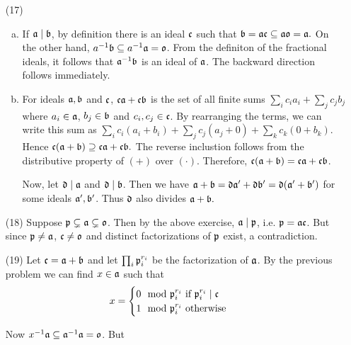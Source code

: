 \documentclass{article}
\theoremstyle{definition}
\theoremstyle{remark}
\begin{document}
\begin{enumerate}
  \item[(17)]
        \begin{enumerate}[(a)]
          \item If $\mathfrak{a} \mid \mathfrak{b}$, by definition there is an ideal $\mathfrak{c}$ such that $\mathfrak{b}  = \mathfrak{a} \mathfrak{c}  \subseteq \mathfrak{a}  \mathfrak{o} = \mathfrak{a}.$ On the other hand,  $\I \I a^{-1}\I b \subseteq a^{-1}\I a = \io$. From the definiton of the fractional ideals, it follows that $\mathfrak{a}^{-1}\mathfrak{b}$ is an ideal of $\mathfrak{a}$. The backward direction follows immediately.


          \item For  ideals $\mathfrak{a}, \mathfrak{b}$ and $\mathfrak{c}$, $\mathfrak{c}\mathfrak{a} + \mathfrak{c}\mathfrak{b}$ is the set of all finite sums $\sum_i c_ia_i + \sum_j c_jb_j$ where $a_i \in \mathfrak{a}$, $b_j \in \mathfrak{b}$ and $c_i, c_j \in \mathfrak{c}$. By rearranging the terms, we can write this sum as $\sum_i c_i(a_i + b_i)+ \sum_j c_j(a_j + 0)+ \sum_k c_k(0 + b_k)$. Hence $\mathfrak{c}(\mathfrak{a} + \mathfrak{b}) \supseteq \mathfrak{c}\mathfrak{a} + \mathfrak{c}\mathfrak{b}.$ The reverse inclustion follows from the distributive property of $(+)$ over $(\cdot)$. Therefore, $\mathfrak{c}(\mathfrak{a} + \mathfrak{b}) = \mathfrak{c}\mathfrak{a} + \mathfrak{c}\mathfrak{b}$.

                Now, let $\mathfrak{d} \mid \mathfrak{a}$ and $\mathfrak{d} \mid \mathfrak{b}$. Then we have $\mathfrak{a} + \mathfrak{b} = \mathfrak{d}\mathfrak{a}' + \mathfrak{d}\mathfrak{b}' = \mathfrak{d}(\mathfrak{a}' + \mathfrak{b}')$ for some ideals $\mathfrak{a}', \mathfrak{b}'$. Thus $\mathfrak{d}$ also divides $\mathfrak{a} + \mathfrak{b}.$
        \end{enumerate}

  \item[(18)] Suppose $\mathfrak{p} \subsetneq \mathfrak{a} \subsetneq \mathfrak{o}$. Then by the above exercise, $\mathfrak{a} \mid \mathfrak{p}$, i.e. $\mathfrak{p} = \mathfrak{a}\mathfrak{c}$. But since $\mathfrak{p} \neq \mathfrak{a}$, $\mathfrak{c} \neq \mathfrak{o}$ and distinct factorizations of $\mathfrak{p}$ exist, a contradiction.

  \item[(19)] Let $\mathfrak{c} = \mathfrak{a} + \mathfrak{b}$ and let $\prod_i\mathfrak{p}_i^{r_i}$ be the factorization of $\mathfrak{a}$. By the previous problem we can find $x \in \mathfrak{a}$ such that
        $$x =
        \begin{cases}
          0 \mod {\mathfrak{p}}_i^{r_i} \text{ if } \mathfrak{p}^{r_i}_i \mid \mathfrak{c} \\
          1 \mod {\mathfrak{p}}^{r_i}_i \text{ otherwise }
        \end{cases}
        $$

    Now $x^{-1}\mathfrak{a} \subseteq \mathfrak{a}^{-1}\mathfrak{a}  = \mathfrak{o}$. But

\end{enumerate}
\end{document}
